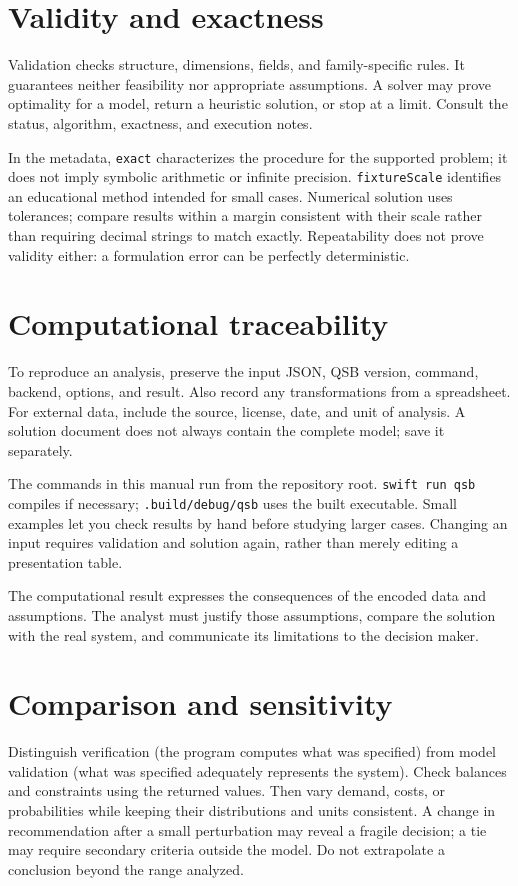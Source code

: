 \section{Validity and exactness}
Validation checks structure, dimensions, fields, and family-specific rules.
It guarantees neither feasibility nor appropriate assumptions. A solver may
prove optimality for a model, return a heuristic solution, or stop at a limit.
Consult the status, algorithm, exactness, and execution notes.

In the metadata, \texttt{exact} characterizes the procedure for the supported
problem; it does not imply symbolic arithmetic or infinite precision.
\texttt{fixtureScale} identifies an educational method intended for small cases.
Numerical solution uses tolerances; compare results within a margin consistent
with their scale rather than requiring decimal strings to match exactly.
Repeatability does not prove validity either: a formulation error can be
perfectly deterministic.

\section{Computational traceability}
To reproduce an analysis, preserve the input JSON, QSB version, command, backend,
options, and result. Also record any transformations from a spreadsheet. For
external data, include the source, license, date, and unit of analysis. A
solution document does not always contain the complete model; save it separately.

The commands in this manual run from the repository root. \texttt{swift run qsb}
compiles if necessary; \texttt{.build/debug/qsb} uses the built executable. Small
examples let you check results by hand before studying larger cases. Changing
an input requires validation and solution again, rather than merely editing a
presentation table.

\begin{observacion}
The computational result expresses the consequences of the encoded data and
assumptions. The analyst must justify those assumptions, compare the solution
with the real system, and communicate its limitations to the decision maker.
\end{observacion}

\section{Comparison and sensitivity}
Distinguish verification (the program computes what was specified) from model
validation (what was specified adequately represents the system). Check balances
and constraints using the returned values. Then vary demand, costs, or
probabilities while keeping their distributions and units consistent. A change
in recommendation after a small perturbation may reveal a fragile decision; a
tie may require secondary criteria outside the model. Do not extrapolate a
conclusion beyond the range analyzed.
